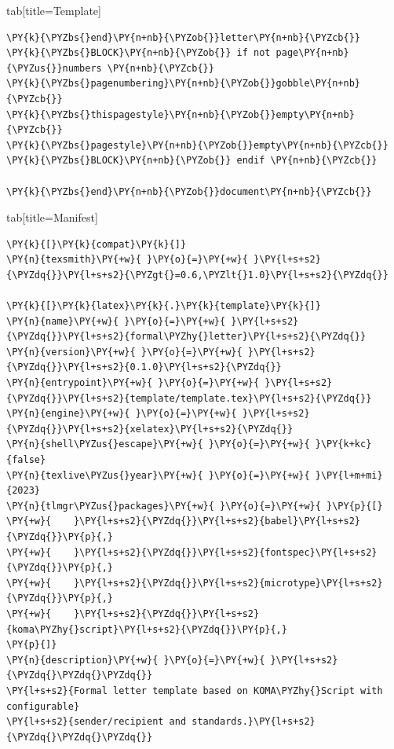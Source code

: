 \documentclass[a4paper,twoside]{article}
\begin{document}
\begin{tsdiv}{tab}[title=Template]
\begin{tscode}[lang=latex, engine=pygments]
\begin{Verbatim}[commandchars=\\\{\},breaklines, breakanywhere, commandchars=\\\{\}]
\PY{k}{\PYZbs{}end}\PY{n+nb}{\PYZob{}}letter\PY{n+nb}{\PYZcb{}}
\PY{k}{\PYZbs{}BLOCK}\PY{n+nb}{\PYZob{}} if not page\PY{n+nb}{\PYZus{}}numbers \PY{n+nb}{\PYZcb{}}
\PY{k}{\PYZbs{}pagenumbering}\PY{n+nb}{\PYZob{}}gobble\PY{n+nb}{\PYZcb{}}
\PY{k}{\PYZbs{}thispagestyle}\PY{n+nb}{\PYZob{}}empty\PY{n+nb}{\PYZcb{}}
\PY{k}{\PYZbs{}pagestyle}\PY{n+nb}{\PYZob{}}empty\PY{n+nb}{\PYZcb{}}
\PY{k}{\PYZbs{}BLOCK}\PY{n+nb}{\PYZob{}} endif \PY{n+nb}{\PYZcb{}}

\PY{k}{\PYZbs{}end}\PY{n+nb}{\PYZob{}}document\PY{n+nb}{\PYZcb{}}
\end{Verbatim}
\end{tscode}
\end{tsdiv}
\begin{tsdiv}{tab}[title=Manifest]
\begin{tscode}[lang=toml, engine=pygments]
\begin{Verbatim}[commandchars=\\\{\},breaklines, breakanywhere, commandchars=\\\{\}]
\PY{k}{[}\PY{k}{compat}\PY{k}{]}
\PY{n}{texsmith}\PY{+w}{ }\PY{o}{=}\PY{+w}{ }\PY{l+s+s2}{\PYZdq{}}\PY{l+s+s2}{\PYZgt{}=0.6,\PYZlt{}1.0}\PY{l+s+s2}{\PYZdq{}}

\PY{k}{[}\PY{k}{latex}\PY{k}{.}\PY{k}{template}\PY{k}{]}
\PY{n}{name}\PY{+w}{ }\PY{o}{=}\PY{+w}{ }\PY{l+s+s2}{\PYZdq{}}\PY{l+s+s2}{formal\PYZhy{}letter}\PY{l+s+s2}{\PYZdq{}}
\PY{n}{version}\PY{+w}{ }\PY{o}{=}\PY{+w}{ }\PY{l+s+s2}{\PYZdq{}}\PY{l+s+s2}{0.1.0}\PY{l+s+s2}{\PYZdq{}}
\PY{n}{entrypoint}\PY{+w}{ }\PY{o}{=}\PY{+w}{ }\PY{l+s+s2}{\PYZdq{}}\PY{l+s+s2}{template/template.tex}\PY{l+s+s2}{\PYZdq{}}
\PY{n}{engine}\PY{+w}{ }\PY{o}{=}\PY{+w}{ }\PY{l+s+s2}{\PYZdq{}}\PY{l+s+s2}{xelatex}\PY{l+s+s2}{\PYZdq{}}
\PY{n}{shell\PYZus{}escape}\PY{+w}{ }\PY{o}{=}\PY{+w}{ }\PY{k+kc}{false}
\PY{n}{texlive\PYZus{}year}\PY{+w}{ }\PY{o}{=}\PY{+w}{ }\PY{l+m+mi}{2023}
\PY{n}{tlmgr\PYZus{}packages}\PY{+w}{ }\PY{o}{=}\PY{+w}{ }\PY{p}{[}
\PY{+w}{    }\PY{l+s+s2}{\PYZdq{}}\PY{l+s+s2}{babel}\PY{l+s+s2}{\PYZdq{}}\PY{p}{,}
\PY{+w}{    }\PY{l+s+s2}{\PYZdq{}}\PY{l+s+s2}{fontspec}\PY{l+s+s2}{\PYZdq{}}\PY{p}{,}
\PY{+w}{    }\PY{l+s+s2}{\PYZdq{}}\PY{l+s+s2}{microtype}\PY{l+s+s2}{\PYZdq{}}\PY{p}{,}
\PY{+w}{    }\PY{l+s+s2}{\PYZdq{}}\PY{l+s+s2}{koma\PYZhy{}script}\PY{l+s+s2}{\PYZdq{}}\PY{p}{,}
\PY{p}{]}
\PY{n}{description}\PY{+w}{ }\PY{o}{=}\PY{+w}{ }\PY{l+s+s2}{\PYZdq{}\PYZdq{}\PYZdq{}}
\PY{l+s+s2}{Formal letter template based on KOMA\PYZhy{}Script with configurable}
\PY{l+s+s2}{sender/recipient and standards.}\PY{l+s+s2}{\PYZdq{}\PYZdq{}\PYZdq{}}


\end{Verbatim}
\end{tscode}
\end{tsdiv}
\end{document}
